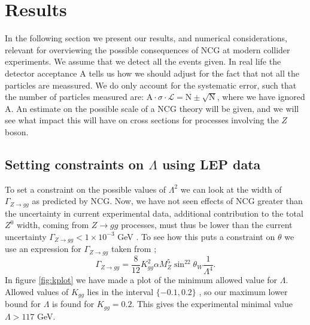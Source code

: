 \section{Results}
In the following section we present our results, and numerical considerations, relevant for overviewing the possible consequences of NCG at modern collider experiments. We assume that we detect all the events given. In real life the detector acceptance A tells us how we should adjust for the fact that not all the particles are meassured. We do only account for the systematic error, such that the number of particles measured are: $\textrm{A} \cdot \sigma\cdot \mathcal{L}=\textrm{N} \pm \sqrt{\textrm{N} }$, where we have ignored A. An estimate on the possible scale of a NCG theory will be given, and we will see what impact this will have on cross sections for processes involving the $Z$ boson.

\subsection{Setting constraints on $\Lambda$ using LEP data}
To set a constraint on the possible values of $\Lambda^2$ we can look at the width of $\Gamma_{Z \rightarrow gg}$ as predicted by NCG. Now, we have not seen effects of NCG greater than the uncertainty in current experimental data, additional contribution to the total $Z^0$ width, coming from $Z \rightarrow gg$ processes, must thus be lower than the current uncertainty $\Gamma_{Z \rightarrow gg} < 1 \times 10^{-3}$ GeV \cite{behr2003dnc}. To see how this puts a constraint on $\theta$ we use an expression for $\Gamma_{Z \rightarrow gg}$ taken from \cite{behr2003dnc};
\begin{equation} \label{eq:zggwidth}
	\Gamma_{Z \rightarrow gg} = \frac{8}{12} K_{gg}^2 \alpha M_Z^5 \sin^22\theta_W \frac{1}{\Lambda^4}.
\end{equation}
In figure \ref{fig:kplot} we have made a plot of the minimum allowed value for $\Lambda$. Allowed values of $K_{gg}$ lies in the interval $\{-0.1,0.2\}$ \cite{behr2003dnc}, so our maximum lower bound for $\Lambda$ is found for $K_{gg}=0.2$. This gives the experimental minimal value $\Lambda >117$ GeV.


